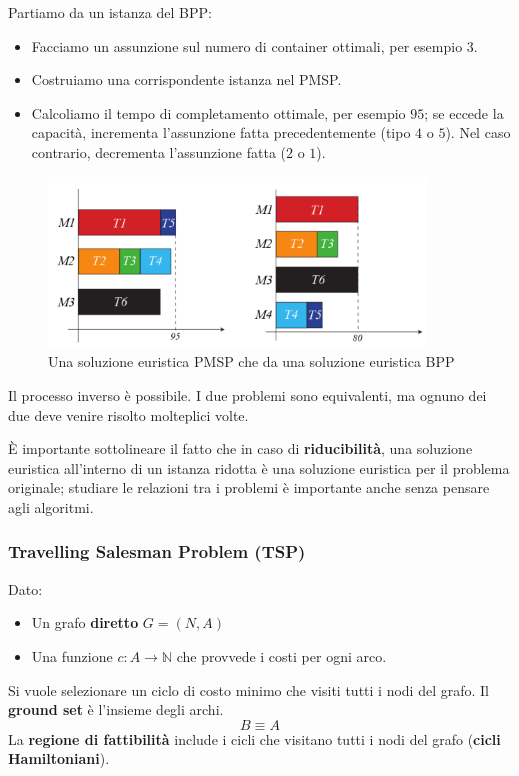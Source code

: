\documentclass{article}
\begin{document}
Partiamo da un istanza del BPP:
\begin{itemize}
    \item Facciamo un assunzione sul numero di container ottimali, per esempio $3$.
    \item Costruiamo una corrispondente istanza nel PMSP.
    \item Calcoliamo il tempo di completamento ottimale, per esempio $95$; se eccede la capacità,
          incrementa l'assunzione fatta precedentemente (tipo $4$ o $5$). Nel caso contrario, decrementa
          l'assunzione fatta ($2$ o $1$).
\end{itemize}

\begin{figure}[H]
    \centering
    \includegraphics[width=10cm]{images/interlude5_BPP_scp.png}
    \caption{Una soluzione euristica PMSP che da una soluzione euristica BPP}
    \label{fig:interlude5_PMSP_BPP}
\end{figure}
Il processo inverso è possibile. I due problemi sono equivalenti, ma ognuno dei due deve venire risolto molteplici
volte.

È importante sottolineare il fatto che in caso di \textbf{riducibilità}, una soluzione euristica all'interno di un
istanza ridotta è una soluzione euristica per il problema originale; studiare le relazioni tra i problemi è importante
anche senza pensare agli algoritmi.

\subsubsection{Travelling Salesman Problem (TSP)}
Dato:
\begin{itemize}
    \item Un grafo \textbf{diretto} $G=(N,A)$
    \item Una funzione $c:A\rightarrow\mathbb{N}$ che provvede i costi per ogni arco.
\end{itemize}
Si vuole selezionare un ciclo di costo minimo che visiti tutti i nodi del grafo. Il \textbf{ground set} è l'insieme
degli archi.
$$B\equiv A$$
La \textbf{regione di fattibilità} include i cicli che visitano tutti i nodi del grafo (\textbf{cicli Hamiltoniani}).
\end{document}
